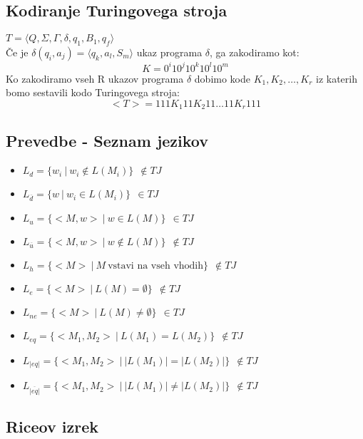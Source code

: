 \documentclass[a4paper]{article}
\begin{document}
\begin{multicols}{2}

\subsection*{Kodiranje Turingovega stroja}
$T=\langle Q,\Sigma,\Gamma,\delta,q_1,B_1,q_f \rangle$ \\
Če je $\delta(q_i,a_j)=\langle q_k, a_l, S_m \rangle$ ukaz programa $\delta$, ga zakodiramo kot:
	\[ K=0^i 1 0^j 1 0^k 1 0^l 1 0^m\]
Ko zakodiramo vseh R ukazov programa $\delta$ dobimo kode $K_1, K_2, \dots, K_r$ iz katerih bomo sestavili kodo Turingovega stroja:
	\[ <T> = 111 K_1 11 K_2 11 \dots 11 K_r 111\]%

\subsection*{Prevedbe - Seznam jezikov}
\begin{itemize}

\item $L_d = \lbrace w_i \ | \ w_i \not\in L(M_i) \rbrace \ \ \not\in TJ $ 
\item $L_{\overline{d}} = \lbrace w \ | \ w_i \in L(M_i) \rbrace \ \ \in TJ $ 
\item $L_u = \lbrace <M,w> \ | \ w \in L(M) \rbrace \ \ \in TJ $ 
\item $L_{\overline{u}} = \lbrace <M,w> \ | \ w \not\in L(M) \rbrace \ \ \not\in TJ $ 
\item $L_h = \lbrace <M> \ | \ M \ \text{vstavi na vseh vhodih} \rbrace \ \ \not\in TJ $ 
\item $L_e = \lbrace <M> \ | \ L(M) = \emptyset \rbrace \ \ \not\in TJ $ 
\item $L_{ne} = \lbrace <M> \ | \ L(M) \neq \emptyset \rbrace \ \ \in TJ $ 
\item $L_{eq} = \lbrace <M_1,M_2> \ | \ L(M_1) = L(M_2) \rbrace \ \ \not\in TJ $ 
\item $L_{|eq|} = \lbrace <M_1,M_2> \ | \ |L(M_1)| = |L(M_2)| \rbrace \ \ \not\in TJ $ 
\item $L_{ \overline{ |eq|}} = \lbrace <M_1,M_2> \ | \ |L(M_1)| \neq |L(M_2)| \rbrace \ \ \not\in TJ $ 

\end{itemize}

\subsection*{Riceov izrek}


\end{multicols}
\end{document}
